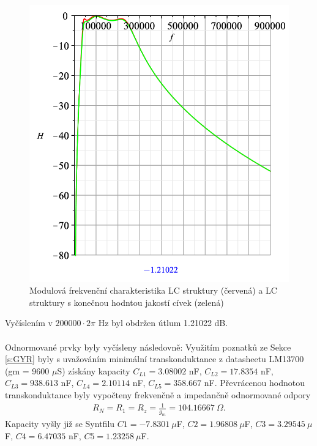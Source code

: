 \endgroup
\begin{figure}[h]
\centering
\includegraphics[scale=0.6]{modul12.png}
\caption{Modulová frekvenční charakteristika LC struktury (červená) a LC struktury s konečnou hodntou jakostí cívek (zelená)}
\end{figure}
\noindent Vyčíslením v $200000 \cdot 2 \pi$ Hz byl obdržen útlum 1.21022 dB.\\
\\
\noindent Odnormované prvky byly vyčísleny následovně:
\noindent Využitím poznatků ze Sekce \ref{s:GYR} byly s uvažováním minimální transkonduktance z datasheetu LM13700 (gm = 9600 $\mu$S) získány kapacity $C_{L1} = 3.08002 $ nF, $C_{L2} = 17.8354$ nF, $C_{L3} = 938.613 $ nF, $C_{L4} = 2.10114$ nF, $C_{L5} = 358.667$ nF.
\noindent Převrácenou hodnotou transkonduktance byly vypočteny frekvenčně a impedančně odnormované odpory
\begin{align}
R_N = R_1 = R_z = \frac{1}{g_m} = 104.16667 \ \Omega.
\end{align}
\noindent Kapacity vyšly již se Syntfilu $C1 = -7.8301 \  \mu$F, $C2 = 1.96808 \  \mu$F, $C3 = 3.29545 \  \mu$F, $C4 = 6.47035$ nF, $C5 = 1.23258 \  \mu$F.
\newpage
